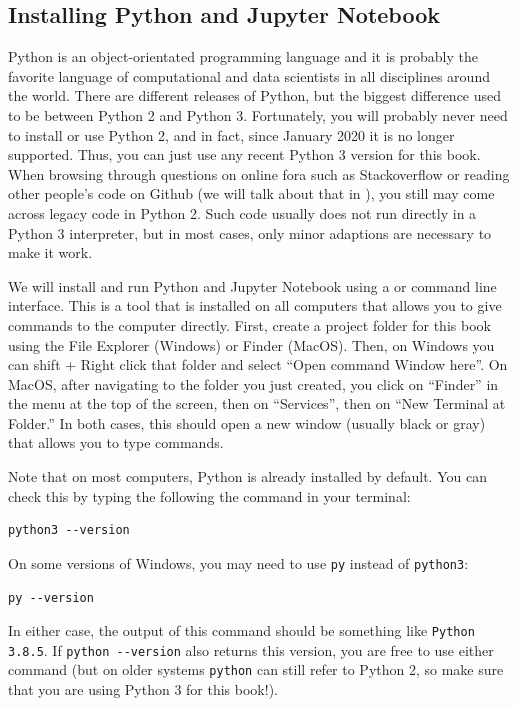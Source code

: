 \subsection{Installing Python and Jupyter Notebook}\label{sec:installpy}

Python is an object-orientated programming language
and it is probably the favorite language of computational and data
scientists in all disciplines around the world.
There are different releases of Python, but the biggest difference used to be between Python 2 and Python 3.
Fortunately, you will probably never need to install or use Python 2, and in fact, since January 2020 it is no longer supported.
Thus, you can just use any recent Python 3 version for this book.
When browsing through questions on online fora such as Stackoverflow or reading other people's code on Github (we will talk about that in ), you still may come across legacy code in Python 2. Such code usually does not run directly in a Python 3 interpreter, but in most cases, only minor adaptions are necessary to make it work.

We will install and run Python and Jupyter Notebook using a  or command line interface.
This is a tool that is installed on all computers that allows you to give commands to the computer directly.
First, create a project folder for this book using the File Explorer (Windows) or Finder (MacOS).
Then, on Windows you can shift + Right click that folder and select ``Open command Window here''.
On MacOS, after navigating to the folder you just created, you click on ``Finder'' in the menu at the top of the screen, then on ``Services'', then on ``New Terminal at Folder.''
In both cases, this should open a new window (usually black or gray) that allows you to type commands.

Note that on most computers, Python is already installed by default.
You can check this by typing the following the command in your terminal:

\begin{verbatim}
python3 --version
\end{verbatim}

On some versions of Windows, you may need to use \verb|py| instead of \verb|python3|:
\begin{verbatim}
py --version
\end{verbatim}

In either case, the output of this command should be something like \verb|Python 3.8.5|.
If \verb|python --version| also returns this version, you are free to use either command
(but on older systems \verb|python| can still refer to Python 2, so make sure that you are using Python 3 for this book!).

